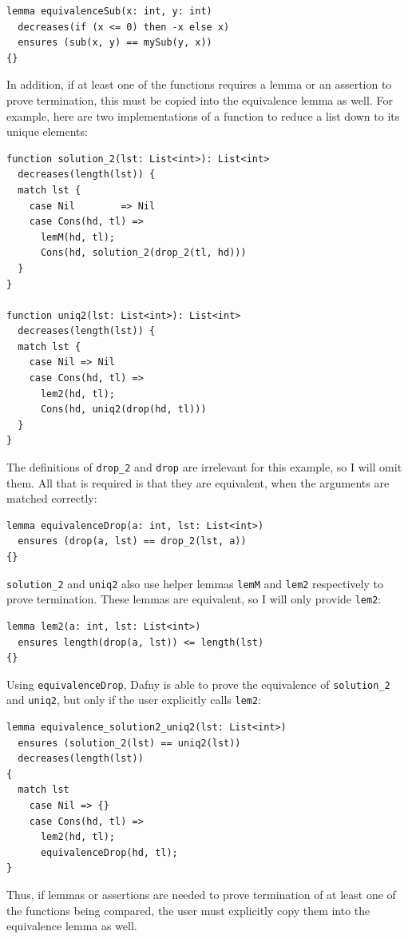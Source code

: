 \documentclass[a4paper, 11pt]{article}
\begin{document}
\begin{lstlisting}[caption=Equivalence Lemma for \lstinline|sub| and \lstinline|mySub|]
lemma equivalenceSub(x: int, y: int)
  decreases(if (x <= 0) then -x else x)
  ensures (sub(x, y) == mySub(y, x))
{}
\end{lstlisting}
%
In addition, if at least one of the functions requires a lemma or an assertion to prove termination, this must be copied into the equivalence lemma as well. For example, here are two implementations of a function to reduce a list down to its unique elements:
\begin{lstlisting}[caption=\lstinline|solution_2| and \lstinline|uniq2| Functions]
function solution_2(lst: List<int>): List<int>
  decreases(length(lst)) {
  match lst {
    case Nil        => Nil
    case Cons(hd, tl) =>
      lemM(hd, tl);
      Cons(hd, solution_2(drop_2(tl, hd)))
  }
}

function uniq2(lst: List<int>): List<int>
  decreases(length(lst)) {
  match lst {
    case Nil => Nil
    case Cons(hd, tl) =>
      lem2(hd, tl);
      Cons(hd, uniq2(drop(hd, tl)))
  }
}
\end{lstlisting}
%
The definitions of \lstinline|drop_2| and \lstinline|drop| are irrelevant for this example, so I will omit them. All that is required is that they are equivalent, when the arguments are matched correctly:
\begin{lstlisting}[caption=Equivalence Lemma for \lstinline|drop_2| and \lstinline|drop|]
lemma equivalenceDrop(a: int, lst: List<int>)
  ensures (drop(a, lst) == drop_2(lst, a))
{}
\end{lstlisting}
%
\lstinline|solution_2| and \lstinline|uniq2| also use helper lemmas \lstinline|lemM| and \lstinline|lem2| respectively to prove termination. These lemmas are equivalent, so I will only provide \lstinline|lem2|:
\begin{lstlisting}[caption=\lstinline|lem2| Helper Lemma]
lemma lem2(a: int, lst: List<int>)
  ensures length(drop(a, lst)) <= length(lst)
{}
\end{lstlisting}
%
Using \lstinline|equivalenceDrop|, Dafny is able to prove the equivalence of \lstinline|solution_2| and \lstinline|uniq2|, but only if the user explicitly calls \lstinline|lem2|:
\begin{lstlisting}[caption=Equivalence Lemma for \lstinline|solution_2| and \lstinline|uniq2|]
lemma equivalence_solution2_uniq2(lst: List<int>)
  ensures (solution_2(lst) == uniq2(lst))
  decreases(length(lst))
{
  match lst
    case Nil => {}
    case Cons(hd, tl) =>
      lem2(hd, tl);
      equivalenceDrop(hd, tl);
}
\end{lstlisting}
%
Thus, if lemmas or assertions are needed to prove termination of at least one of the functions being compared, the user must explicitly copy them into the equivalence lemma as well. 
\end{document}
